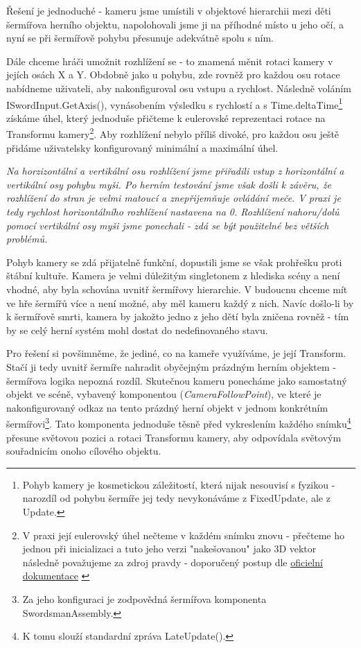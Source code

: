 Řešení je jednoduché - kameru jsme umístili v objektové hierarchii mezi děti šermířova herního objektu, napolohovali jsme ji na příhodné místo u jeho očí, a nyní se při šermířově pohybu přesunuje adekvátně spolu s ním. 

Dále chceme hráči umožnit rozhlížení se - to znamená měnit rotaci kamery v jejích osách X a Y. Obdobně jako u pohybu, zde rovněž pro každou osu rotace nabídneme uživateli, aby nakonfiguroval osu vstupu a rychlost. Následně voláním ISwordInput.GetAxis(), vynásobením výsledku s rychlostí a s Time.deltaTime\footnote{Pohyb kamery je kosmetickou záležitostí, která nijak nesouvisí s fyzikou - narozdíl od pohybu šermíře jej tedy nevykonáváme z FixedUpdate, ale z Update.} získáme úhel, který jednoduše přičteme k eulerovské reprezentaci rotace na Transformu kamery\footnote{V praxi její eulerovský úhel nečteme v každém snímku znovu - přečteme ho jednou při inicializaci a tuto jeho verzi "nakešovanou" jako 3D vektor následně považujeme za zdroj pravdy - doporučený postup dle \href{https://docs.unity3d.com/2022.2/Documentation/ScriptReference/Quaternion-eulerAngles.html}{\underline{oficielní dokumentace}} \cite{Unity}}. Aby rozhlížení nebylo příliš divoké, pro každou osu ještě přidáme uživatelsky konfigurovaný minimální a maximální úhel.

\textit{Na horzizontální a vertikální osu rozhlížení jsme přiřadili vstup z horizontální a vertikální osy pohybu myši. Po herním testování jsme však došli k závěru, že rozhlížení do stran je velmi matoucí a znepřijemňuje ovládání meče. V praxi je tedy rychlost horizontálního rozhlížení nastavena na 0. Rozhlížení nahoru/dolů pomocí vertikální osy myši jsme ponechali - zdá se být použitelné bez větších problémů.}

Pohyb kamery se zdá přijatelně funkční, dopustili jsme se však prohřešku proti štábní kultuře. Kamera je velmi důležitým singletonem z hlediska scény a není vhodné, aby byla schována uvnitř šermířovy hierarchie. V budoucnu chceme mít ve hře šermířů více a není možné, aby měl kameru každý z nich. Navíc došlo-li by k šermířově smrti, kamera by jakožto jedno z jeho dětí byla zničena rovněž - tím by se celý herní systém mohl dostat do nedefinovaného stavu.

Pro řešení si povšimněme, že jediné, co na kameře využíváme, je její Transform. Stačí ji tedy uvnitř šermíře nahradit obyčejným prázdným herním objektem - šermířova logika nepozná rozdíl. Skutečnou kameru ponecháme jako samostatný objekt ve scéně, vybavený komponentou (\textit{CameraFollowPoint}), ve které je nakonfigurovaný odkaz na tento prázdný herní objekt v jednom konkrétním šermířovi\footnote{Za jeho konfiguraci je zodpovědná šermířova komponenta SwordsmanAssembly.}. Tato komponenta jednoduše těsně před vykreslením každého snímku\footnote{K tomu slouží standardní zpráva LateUpdate().} přesune světovou pozici a rotaci Transformu kamery, aby odpovídala světovým souřadnicím onoho cílového objektu. 

